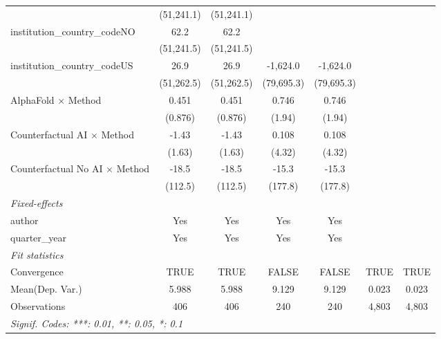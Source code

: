 \begin{tabular}{lcccccc}
                                         & (51,241.1)  & (51,241.1)  &             &             &       &   \\   
   institution\_country\_codeNO          & 62.2        & 62.2        &             &             &       &   \\   
                                         & (51,241.5)  & (51,241.5)  &             &             &       &   \\   
   institution\_country\_codeUS          & 26.9        & 26.9        & -1,624.0    & -1,624.0    &       &   \\   
                                         & (51,262.5)  & (51,262.5)  & (79,695.3)  & (79,695.3)  &       &   \\   
   AlphaFold $\times$ Method             & 0.451       & 0.451       & 0.746       & 0.746       &       &   \\   
                                         & (0.876)     & (0.876)     & (1.94)      & (1.94)      &       &   \\   
   Counterfactual AI $\times$ Method     & -1.43       & -1.43       & 0.108       & 0.108       &       &   \\   
                                         & (1.63)      & (1.63)      & (4.32)      & (4.32)      &       &   \\   
   Counterfactual No AI $\times$ Method  & -18.5       & -18.5       & -15.3       & -15.3       &       &   \\   
                                         & (112.5)     & (112.5)     & (177.8)     & (177.8)     &       &   \\   
   \midrule
   \emph{Fixed-effects}\\
   author                                & Yes         & Yes         & Yes         & Yes         &       & \\  
   quarter\_year                         & Yes         & Yes         & Yes         & Yes         &       & \\  
   \midrule
   \emph{Fit statistics}\\
   Convergence                           &TRUE         & TRUE        & FALSE       & FALSE       & TRUE  & TRUE\\  
Mean(Dep. Var.) & 5.988 & 5.988 & 9.129 & 9.129 & 0.023 & 0.023 \\
   Observations                          & 406         & 406         & 240         & 240         & 4,803 & 4,803\\  
   \midrule \midrule
   \multicolumn{7}{l}{\emph{Signif. Codes: ***: 0.01, **: 0.05, *: 0.1}}\\
\end{tabular}
\par\endgroup
